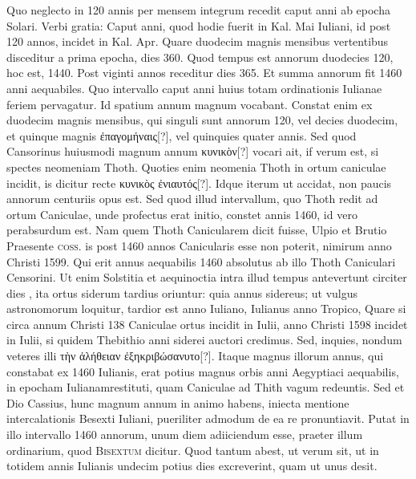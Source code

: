 %
Quo neglecto in
120 annis per mensem integrum recedit caput anni ab epocha Solari.
Verbi gratia: Caput anni, quod hodie fuerit in Kal. Mai Iuliani, id
post 120 annos, incidet in Kal. Apr. %
Quare duodecim magnis mensibus
vertentibus disceditur a prima epocha, dies 360.
Quod tempus
est annorum duodecies 120, hoc est, 1440.
Post viginti annos receditur
dies 365.
Et summa annorum fit 1460 anni aequabiles.
Quo
intervallo caput anni huius totam ordinationis Iulianae feriem pervagatur.
Id spatium annum magnum vocabant.
Constat enim ex duodecim
magnis mensibus, qui singuli sunt annorum 120, vel decies duodecim,
et quinque magnis \textgreek{ἐπαγομήναις}[?], vel quinquies quater annis.
Sed quod Cansorinus huiusmodi magnum annum \textgreek{κυνικὸν}[?]
 vocari ait,
if verum est, si spectes neomeniam Thoth.
Quoties enim neomenia
Thoth in ortum caniculae incidit, is dicitur recte
 \textgreek{κυνικὸς ἐνιαυτός}[?].
Idque iterum ut accidat, non paucis annorum centuriis opus est.
Sed quod illud intervallum, quo Thoth redit ad ortum Caniculae,
unde profectus erat initio, constet annis 1460, id vero perabsurdum
est.
Nam quem Thoth Canicularem dicit fuisse, Ulpio et
Brutio Praesente \textsc{coss.} is post 1460 annos Canicularis esse non
poterit, nimirum anno Christi 1599.
Qui erit annus aequabilis 1460
absolutus ab illo Thoth Caniculari Censorini.
Ut enim Solstitia et
aequinoctia intra illud tempus antevertunt circiter dies , ita ortus
siderum tardius oriuntur: quia annus sidereus; %
 ut vulgus astronomorum
loquitur, tardior est anno Iuliano, Iulianus anno Tropico,
Quare
si circa annum Christi 138 Caniculae ortus incidit in  Iulii, anno
Christi 1598 incidet in  Iulii, si quidem Thebithio anni siderei
auctori credimus.
Sed, inquies, nondum veteres illi \textgreek{τὴν ἀλήθειαν
ἐξηκριβώσανυτο}[?].
Itaque magnus illorum annus, qui constabat ex 1460
Iulianis, erat potius magnus orbis anni Aegyptiaci aequabilis, in epocham
Iulianamrestituti, quam Caniculae ad Thith vagum redeuntis.
Sed et Dio Cassius, hunc magnum annum in animo habens,
iniecta mentione intercalationis Besexti Iuliani, pueriliter admodum
de ea re pronuntiavit.
Putat in illo intervallo 1460 annorum,
unum diem adiiciendum esse, praeter illum ordinarium, quod \textsc{Bisextum}
dicitur.
Quod tantum abest, ut verum sit, ut in totidem
annis Iulianis undecim potius dies excreverint, quam ut unus desit.
